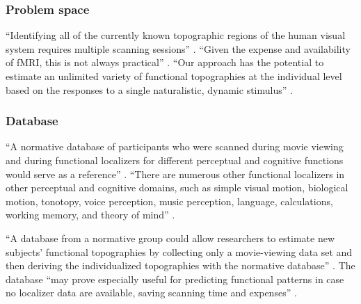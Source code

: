 



\subsubsection{Problem space}

%
``Identifying all of the currently known topographic regions of the human visual
system requires multiple scanning sessions'' \citep{wang2015probabilistic}.
%
``Given the expense and availability of fMRI, this is not always practical''
\citep{wang2015probabilistic}.
%
``Our approach has the potential to estimate an unlimited variety of functional
topographies at the individual level based on the responses to a single
naturalistic, dynamic stimulus'' \citep{jiahui2020predicting}.


\subsubsection{Database}

%
``A normative database of participants who were scanned during movie viewing and
during functional localizers for different perceptual and cognitive functions
would serve as a reference'' \citep{jiahui2020predicting}.
%
``There are numerous other functional localizers in other perceptual and
cognitive domains, such as simple visual motion, biological motion, tonotopy,
voice perception, music perception, language, calculations, working memory, and
theory of mind'' \citep{jiahui2020predicting}.

%
``A database from a normative group could allow researchers to estimate new
subjects' functional topographies by collecting only a movie-viewing data set
and then deriving the individualized topographies with the normative database''
\citep{jiahui2020predicting}.
%
The database ``may prove especially useful for predicting functional patterns in
case no localizer data are available, saving scanning time and expenses''
\citep{rosenke2021probabilistic}.


